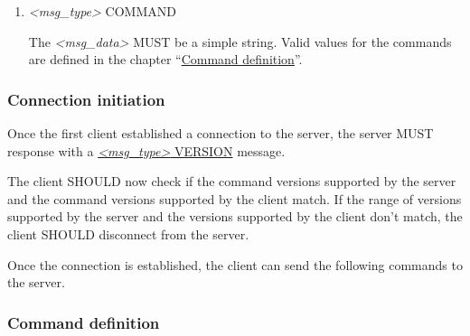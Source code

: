 \documentclass{article}
\begin{document}
\begin{enumerate}
\begin{enumerate}
                The \emph{\textless{}msg\_data\textgreater{}} MUST be a json string having the following structure:
\begin{verbatim}
{
    "minVersion": <min_version>,
    "maxVersion": <max_version>
}
\end{verbatim}

                \emph{\textless{}min\_version\textgreater{}} MUST contain the minimum version of commands that is supported by the current connection.

                \emph{\textless{}max\_version\textgreater{}} MUST contain the maximum version of commands that is supported by the current connection.

                The server or client MUST support all commands that are defined for the range between \emph{\textless{}min\_version\textgreater{}} and \emph{\textless{}max\_version\textgreater{}}, including both boundary values.

            \item \emph{\textless{}msg\_type\textgreater{}} COMMAND
                \label{msg_command}

                The \emph{\textless{}msg\_data\textgreater{}} MUST be a simple string. Valid values for the commands are defined in the chapter ``\hyperref[command_definition]{Command definition}''.
  \end{enumerate}
\end{enumerate}

\subsubsection{Connection initiation}

Once the first client established a connection to the server, the server MUST response with a \hyperref[msg_version]{\emph{\textless{}msg\_type\textgreater{}} VERSION} message.

The client SHOULD now check if the command versions supported by the server and the command versions supported by the client match. If the range of versions supported by the server and the versions supported by the client don't match, the client SHOULD disconnect from the server.

Once the connection is established, the client can send the following commands to the server.

\subsubsection{Command definition}
\label{command_definition}
\end{document}
